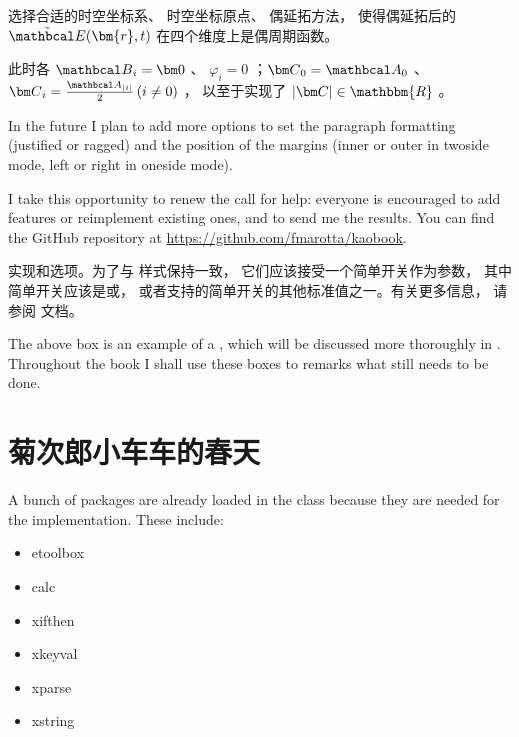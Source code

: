 选择合适的时空坐标系、 时空坐标原点、 偶延拓方法， 
使得偶延拓后的 $ \tilde {{\mathbcal E}}(\bm{r},t) $ 在四个维度上是偶周期函数。 

此时各 $ {\mathbcal B}_i = {\bm 0} $ 、 $ \varphi_i = 0 $ ；$ {\bm C}_0 = {\mathbcal A}_0 $ 、 
$ {\bm C}_i = \frac{{\mathbcal A}_{\left| i \right|}}{2} \left( {i \ne 0} \right) $ ， 以至于实现了 
$ \left| {\bm C} \right| \in \mathbbm{R} $ 。

In the future I plan to add more options to set the paragraph formatting
(justified or ragged) and the position of the margins (inner or outer in
twoside mode, left or right in oneside mode).

I take this opportunity to renew the call for help: everyone is
encouraged to add features or reimplement existing ones, and to send me
the results. You can find the GitHub repository at
\url{https://github.com/fmarotta/kaobook}.

\begin{kaobox}[frametitle=To Do]
实现和选项。为了与\KOMAScript\xspace 样式保持一致， 它们应该接受一个简单开关作为参数， 其中简单开关应该是或， 或者\KOMAScript 支持的简单开关的其他标准值之一。有关更多信息， 请参阅\KOMAScript\xspace 文档。
\end{kaobox}

The above box is an example of a , which will be
discussed more thoroughly in . Throughout the book I
shall use these boxes to remarks what still needs to be done.

\section{菊次郎小车车的春天}

A bunch of packages are already loaded in the class because they are
needed for the implementation. These include:

\begin{itemize}
	\item etoolbox
	\item calc
	\item xifthen
	\item xkeyval
	\item xparse
	\item xstring
\end{itemize}

